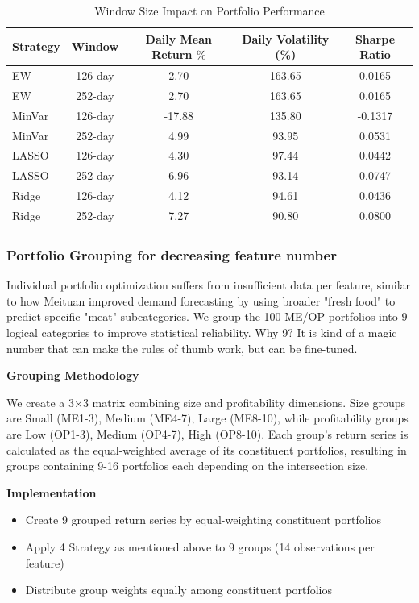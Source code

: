 \documentclass[12pt]{article}
\begin{document}
\begin{table}[h]
\centering
\caption{Window Size Impact on Portfolio Performance}
\label{tab:window_comparison}
\begin{tabular}{lcccc}
\hline
Strategy & Window & Daily Mean Return \(\%\) & Daily Volatility (\%) & Sharpe Ratio \\
\hline
EW & 126-day & 2.70 & 163.65 & 0.0165 \\
EW & 252-day & 2.70 & 163.65 & 0.0165 \\
MinVar & 126-day & -17.88 & 135.80 & -0.1317 \\
MinVar & 252-day & 4.99 & 93.95 & 0.0531 \\
LASSO & 126-day & 4.30 & 97.44 & 0.0442 \\
LASSO & 252-day & 6.96 & 93.14 & 0.0747 \\
Ridge & 126-day & 4.12 & 94.61 & 0.0436 \\
Ridge & 252-day & 7.27 & 90.80 & 0.0800 \\
\hline
\end{tabular}
\end{table}

\subsubsection{Portfolio Grouping for decreasing feature number}

Individual portfolio optimization suffers from insufficient data per feature, similar to how Meituan improved demand forecasting by using broader "fresh food" to predict specific "meat" subcategories. We group the 100 ME/OP portfolios into 9 logical categories to improve statistical reliability. Why 9? It is kind of a magic number that can make the rules of thumb work, but can be fine-tuned.

\textbf{Grouping Methodology}

We create a 3×3 matrix combining size and profitability dimensions. Size groups are Small (ME1-3), Medium (ME4-7), Large (ME8-10), while profitability groups are Low (OP1-3), Medium (OP4-7), High (OP8-10). Each group's return series is calculated as the equal-weighted average of its constituent portfolios, resulting in groups containing 9-16 portfolios each depending on the intersection size.

\textbf{Implementation}
\begin{itemize}
    \item Create 9 grouped return series by equal-weighting constituent portfolios
    \item Apply 4 Strategy as mentioned above to 9 groups (14 observations per feature)
    \item Distribute group weights equally among constituent portfolios
\end{itemize}
\end{document}

